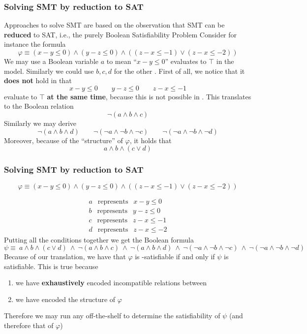 \begin{frame}
  \frametitle{Solving SMT \formulae by reduction to SAT}

  \scriptsize

  Approaches to solve SMT \formulae are based on the observation
  that SMT can be {\bf reduced} to SAT, i.e., the purely Boolean
  Satisfiability Problem
  \vfill
  \pause
  Consider for instance the \Lia formula
  $$
  \varphi \equiv (x - y \leq 0) \wedge (y - z \leq 0) \wedge ((z - x \leq -1) \vee (z - x \leq -2))
  $$
  We may use a Boolean variable $a$ to mean ``$x - y \leq 0$'' evaluates to $\top$
  in the model. Similarly we could use $b, c, d$ for the other \tatoms.
  \vfill
  \pause
  First of all, we notice that it {\bf does not} hold in \Lia that
  $$ x - y \leq 0\quad\quad  y - z \leq 0\quad\quad z - x \leq -1 $$
  evaluate to $\top$ {\bf at the same time}, because this is not possible in \Lia. \pause
  This translates to the Boolean relation 
  $$ \neg( a \wedge b \wedge c )$$ \pause
  Similarly we may derive 
  $$ \neg( a \wedge b \wedge d )\quad\quad \neg( \neg a \wedge \neg b \wedge \neg c )\quad\quad \neg( \neg a \wedge \neg b \wedge \neg d )$$ \pause
  \vfill
  Moreover, because of the ``structure'' of $\varphi$, it holds that 
  $$ a \wedge b \wedge (c \vee d)$$

\end{frame}

\begin{frame}
  \frametitle{Solving SMT \formulae by reduction to SAT}

  \scriptsize

  $$
  \varphi \equiv (x - y \leq 0) \wedge (y - z \leq 0) \wedge ((z - x \leq -1) \vee (z - x \leq -2))
  $$

  $$
  \begin{array}{l}
  a \ \ \mbox{ represents } \ \ x - y \leq 0 \\
  b \ \ \mbox{ represents } \ \ y - z \leq 0 \\
  c \ \ \mbox{ represents } \ \ z - x \leq -1 \\
  d \ \ \mbox{ represents } \ \ z - x \leq -2
  \end{array}
  $$
  \vfill
  \pause
  Putting all the conditions together we get the Boolean formula
  $$ 
  \psi \equiv\ a \wedge b \wedge (c \vee d)\ \wedge\ \neg( a \wedge b \wedge c )\ \wedge\ \neg( a \wedge b \wedge d )\ \wedge\
  \neg( \neg a \wedge \neg b \wedge \neg c )\ \wedge\ \neg( \neg a \wedge \neg b \wedge \neg d )
  $$ \pause
  Because of our translation, we have that $\varphi$ is \Lia-satisfiable if and only if $\psi$ is
  satisfiable. This is true because
  \begin{enumerate}
    \item we have {\bf exhaustively} encoded incompatible relations between \tatoms 
    \item we have encoded the structure of $\varphi$
  \end{enumerate} \pause
  Therefore we may run any off-the-shelf \satsolver to determine the satisfiability of $\psi$ 
  (and therefore that of $\varphi$)

\end{frame}

